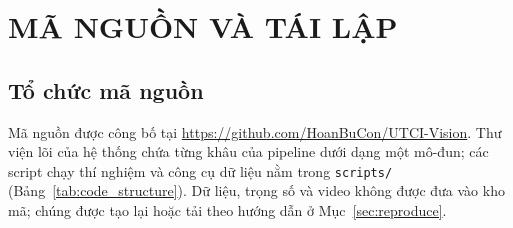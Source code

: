 \appendix
{}
\chapter{MÃ NGUỒN VÀ TÁI LẬP}
\label{app:code}

\section{Tổ chức mã nguồn}
Mã nguồn được công bố tại \url{https://github.com/HoanBuCon/UTCI-Vision}. Thư viện lõi của hệ thống chứa từng khâu của pipeline dưới dạng một mô-đun; các script chạy thí nghiệm và công cụ dữ liệu nằm trong \texttt{scripts/} (Bảng~\ref{tab:code_structure}). Dữ liệu, trọng số và video không được đưa vào kho mã; chúng được tạo lại hoặc tải theo hướng dẫn ở Mục~\ref{sec:reproduce}.

